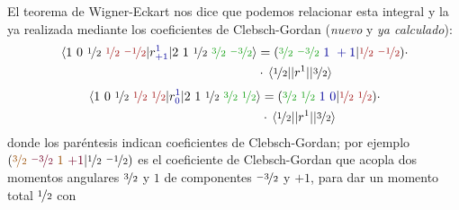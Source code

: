 El teorema de Wigner-Eckart nos dice que podemos relacionar esta
integral y la ya realizada mediante los coeficientes de
Clebsch-Gordan (\emph{nuevo} y \emph{ya calculado}):
  \begin{equation}
    \begin{split}
      \mel {1\ 0\ \nicefrac{1}{2} \ \textcolor{red!60!black}{\oh\
          \nicefrac{-1}{2}}}
      {r_{\textcolor{blue!60!black}{+1}}^{\textcolor{blue!60!black}{1}}}
      {2\ 1\ \oh \ \textcolor{green!60!black}{\nicefrac{3}{2}\
          \nicefrac{-3}{2}}} &= (
      \textcolor{green!60!black}{\nicefrac{3}{2}\ \nicefrac{-3}{2}}\
      \textcolor{blue!60!black}{1 \ +1} | \textcolor{red!60!black}{\oh
        \ \nicefrac{-1}{2}} ) \cdot \\ &\cdot
      \mel{\oh}{|r^1|}{\nicefrac{3}{2}} 
    \end{split}
      \end{equation}
      \begin{equation}
        \begin{split}
          \mel {1\ 0\ \nicefrac{1}{2} \ \textcolor{red!60!black}{\oh\
              \oh}}
          {r_{\textcolor{blue!60!black}{0}}^{\textcolor{blue!60!black}{1}}}
          {2\ 1\ \oh \ \textcolor{green!60!black}{\nicefrac{3}{2}\
              \nicefrac{1}{2}}} &= (
          \textcolor{green!60!black}{\nicefrac{3}{2}\
            \nicefrac{1}{2}}\ \textcolor{blue!60!black}{1 \ 0} |
          \textcolor{red!60!black}{\oh \ \oh} ) \cdot \\
          &\cdot
          \mel{\oh}{|r^1|}{\nicefrac{3}{2}} 
        \end{split} 
  \end{equation}
donde los paréntesis indican coeficientes de Clebsch-Gordan; por
ejemplo $(
      \textcolor{orange!60!black}{\nicefrac{3}{2}}\ 
      \textcolor{purple!60!black}{\nicefrac{-3}{2}}\
      \textcolor{orange!60!black}{1}
      \ \textcolor{purple!60!black}{+1}
      |
      \oh \ \nicefrac{-1}{2}
      )$ es el coeficiente de Clebsch-Gordan que acopla dos
      \textcolor{orange!60!black}{momentos angulares}
      $\nicefrac{3}{2}$ y $1$ de \textcolor{purple!60!black}{componentes}
      $\nicefrac{-3}{2}$ y $+1$, para dar un momento total ${\nicefrac{1}{2}}$ con
